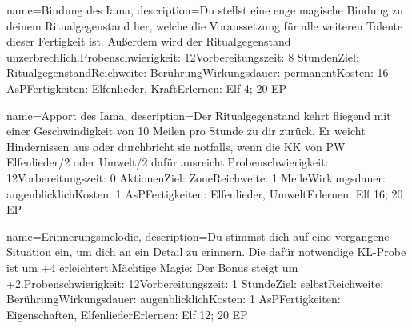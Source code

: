 {
    name={Bindung des Iama},
    description={Du stellst eine enge magische Bindung zu deinem Ritualgegenstand her, welche die Voraussetzung für alle weiteren Talente dieser Fertigkeit ist. Außerdem wird der Ritualgegenstand unzerbrechlich.\newline Probenschwierigkeit: 12\newline Vorbereitungszeit: 8 Stunden\newline Ziel: Ritualgegenstand\newline Reichweite: Berührung\newline Wirkungsdauer: permanent\newline Kosten: 16 AsP\newline Fertigkeiten: Elfenlieder, Kraft\newline Erlernen: Elf 4; 20 EP}
}


{
    name={Apport des Iama},
    description={Der Ritualgegenstand kehrt fliegend mit einer Geschwindigkeit von 10 Meilen pro Stunde zu dir zurück. Er weicht Hindernissen aus oder durchbricht sie notfalls, wenn die KK von PW Elfenlieder/2 oder Umwelt/2 dafür ausreicht.\newline Probenschwierigkeit: 12\newline Vorbereitungszeit: 0 Aktionen\newline Ziel: Zone\newline Reichweite: 1 Meile\newline Wirkungsdauer: augenblicklich\newline Kosten: 1 AsP\newline Fertigkeiten: Elfenlieder, Umwelt\newline Erlernen: Elf 16; 20 EP}
}


{
    name={Erinnerungsmelodie},
    description={Du stimmst dich auf eine vergangene Situation ein, um dich an ein Detail zu erinnern. Die dafür notwendige KL-Probe ist um +4 erleichtert.\newline Mächtige Magie: Der Bonus steigt um +2.\newline Probenschwierigkeit: 12\newline Vorbereitungszeit: 1 Stunde\newline Ziel: selbst\newline Reichweite: Berührung\newline Wirkungsdauer: augenblicklich\newline Kosten: 1 AsP\newline Fertigkeiten: Eigenschaften, Elfenlieder\newline Erlernen: Elf 12; 20 EP}
}


